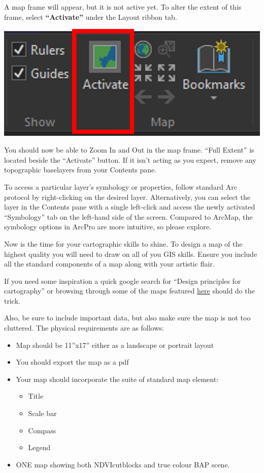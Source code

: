 \documentclass[
]{book}
\providecommand{\tightlist}{%
  \setlength{\itemsep}{0pt}\setlength{\parskip}{0pt}}
\begin{document}
A map frame will appear, but it is not active yet. To alter the extent of this frame, select \textbf{``Activate''} under the Layout ribbon tab.

\begin{center}\includegraphics[width=0.3\linewidth]{images/07-activate-map-frame} \end{center}

You should now be able to Zoom In and Out in the map frame. ``Full Extent'' is located beside the ``Activate'' button. If it isn't acting as you expect, remove any topographic baselayers from your Contents pane.

To access a particular layer's symbology or properties, follow standard Arc protocol by right-clicking on the desired layer. Alternatively, you can select the layer in the Contents pane with a single left-click and access the newly activated ``Symbology'' tab on the left-hand side of the screen. Compared to ArcMap, the symbology options in ArcPro are more intuitive, so please explore.

Now is the time for your cartographic skills to shine. To design a map of the highest quality you will need to draw on all of you GIS skills. Ensure you include all the standard components of a map along with your artistic flair.

If you need some inspiration a quick google search for ``Design principles for cartography'' or browsing through some of the maps featured \href{https://www.esri.com/en-us/maps-we-love/gallery}{here} should do the trick.

Also, be sure to include important data, but also make sure the map is not too cluttered.
The physical requirements are as follows:

\begin{itemize}
\item
  Map should be 11''x17'' either as a landscape or portrait layout
\item
  You should export the map as a pdf
\item
  Your map should incorporate the suite of standard map element:

  \begin{itemize}
  \tightlist
  \item
    Title
  \item
    Scale bar
  \item
    Compass
  \item
    Legend
  \end{itemize}
\item
  ONE map showing both NDVIcutblocks and true colour BAP scene.
\end{itemize}
\end{document}
